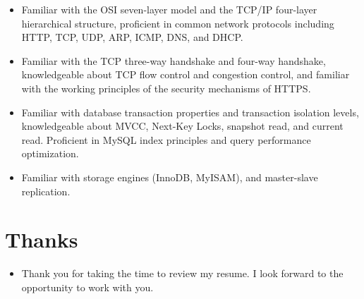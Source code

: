\documentclass{resume}
\newcommand{\en}[1]{#1}
\newcommand{\zh}[1]{}
\begin{document}
\begin{itemize}[parsep=0.25ex]
     \item \en{Familiar with the OSI seven-layer model and the TCP/IP four-layer hierarchical structure, proficient in common network protocols including HTTP, TCP, UDP, ARP, ICMP, DNS, and DHCP.}
           \zh{熟悉数据库事务特性、事务隔离级别，了解 MVCC、Next-Key Locks、快照读与当前读}

     \item \en{Familiar with the TCP three-way handshake and four-way handshake, knowledgeable about TCP flow control and congestion control, and familiar with the working principles of the security mechanisms of HTTPS.}
           \zh{熟悉 Redis 数据类型，了解过期键删除、数据淘汰策略、RDB 和 AOF 持久化机制}

     \item \en{Familiar with database transaction properties and transaction isolation levels, knowledgeable about MVCC, Next-Key Locks, snapshot read, and current read. Proficient in MySQL index principles and query performance optimization.}
           \zh{熟悉 TCP 三次握手和四次挥手，了解 TCP 流量控制和拥塞控制，了解 Https 的安全机制的工作原理}

     \item \en{Familiar with storage engines (InnoDB, MyISAM), and master-slave replication.}
           \zh{积极探索LLM如ChatGPT 4和GitHub Copilot，提升编码效率。持续学习，通过技术博客、开源项目保持技术前沿，激发创新热情，适应技术变革。}
\end{itemize}

\section{\en{Thanks}\zh{致谢}}
\begin{itemize}
     \item \en{Thank you for taking the time to review my resume. I look forward to the opportunity to work with you.}
           \zh{感谢您花时间阅读我的简历，期待能有机会和您共事}
\end{itemize}
\end{document}
